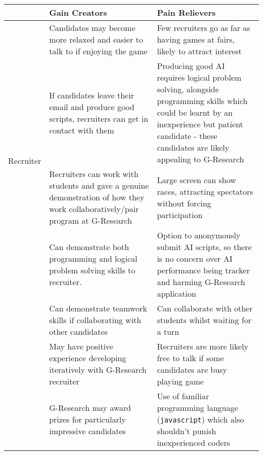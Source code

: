 \begin{adjustbox}{center}
	\begin{tabular*}{\textwidth}{| c | p{} | p{}|}
	\hline
	& Gain Creators & Pain Relievers \\ 
	\hline\hline
	\multirow{4}{*}{Recruiter} 
		       & Candidates may become more relaxed and easier to talk to if enjoying the game
		       & Few recruiters go as far as having games at fairs, likely to attract interest \\ \cline{2-3}

		       & If candidates leave their email and produce good scripts, recruiters can get in contact with them
		       & Producing good AI requires logical problem solving, alongside programming skills which could be learnt by an inexperience but patient candidate - these candidates are likely appealing to G-Research\\ \cline{2-3}
	
		       & Recruiters can work with students and gave a genuine demonstration of how they work collaboratively/pair program at G-Research
		       & Large screen can show races, attracting spectators without forcing participation\\ 
	\hline\hline
\multirow{4}{*}{Student} 
		       & Can demonstrate both programming and logical problem solving skills to recruiter.
		       & Option to anonymously submit AI scripts, so there is no concern over AI performance being tracker and harming G-Research application\\ \cline{2-3}

		       & Can demonstrate teamwork skills if collaborating with other candidates
		       & Can collaborate with other students whilst waiting for a turn\\ \cline{2-3}

		       & May have positive experience developing iteratively with G-Research recruiter
		       & Recruiters are more likely free to talk if some candidates are busy playing game\\ \cline{2-3}
		       
		       & G-Research may award prizes for particularly impressive candidates
		       & Use of familiar programming language ({\tt javascript}) which also shouldn't punish inexperienced coders\\ 
	\hline
	\end{tabular*}
\end{adjustbox}

